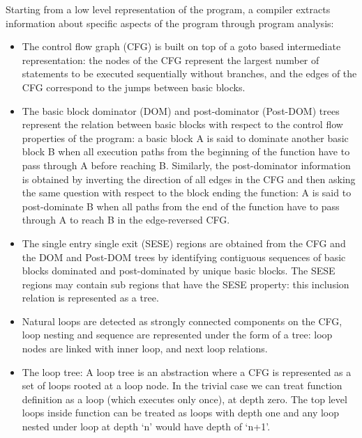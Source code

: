 \documentclass{sigplanconf}
\begin{document}
Starting from a low level representation of the program, a compiler extracts
information about specific aspects of the program through program analysis:

\begin{itemize}
\item The control flow graph (CFG) \cite{dragonbook} is built on top of a goto
  based intermediate representation: the nodes of the CFG represent the largest
  number of statements to be executed sequentially without branches, and the
  edges of the CFG correspond to the jumps between basic blocks.

\item The basic block dominator (DOM) and post-dominator (Post-DOM) trees
  \cite{dragonbook} represent the relation between basic blocks with respect to
  the control flow properties of the program: a basic block A is said to
  dominate another basic block B when all execution paths from the beginning of
  the function have to pass through A before reaching B.  Similarly, the
  post-dominator information is obtained by inverting the direction of all edges
  in the CFG and then asking the same question with respect to the block ending
  the function: A is said to post-dominate B when all paths from the end of the
  function have to pass through A to reach B in the edge-reversed CFG.

\item The single entry single exit (SESE) regions \cite{sese} are
  obtained from the CFG and the DOM and Post-DOM trees by identifying contiguous
  sequences of basic blocks dominated and post-dominated by unique basic blocks.
  The SESE regions may contain sub regions that have the SESE property: this
  inclusion relation is represented as a tree.

\item Natural loops \cite{dragonbook} are detected as strongly connected
  components \cite{tarjan} on the CFG, loop nesting and sequence are represented
  under the form of a tree: loop nodes are linked with inner loop, and next loop
  relations.

\item The loop tree:
A loop tree is an abstraction where a CFG is represented as a set of loops rooted at a loop node. In the trivial case we can treat function definition as a loop (which executes only once), at depth zero. The top level loops inside function can be treated as loops with depth one and any loop nested under loop at depth `n' would have depth of `n+1'.


\end{itemize}
\end{document}
